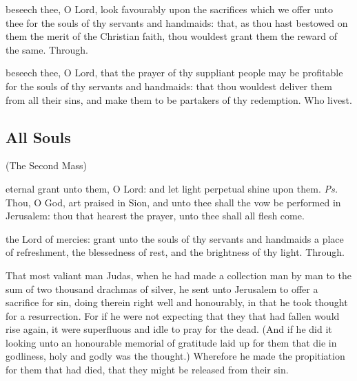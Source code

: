 \secret
{} beseech thee, O Lord, look favourably upon the sacrifices which we offer unto thee for the souls of thy servants and handmaids: that, as thou hast bestowed on them the merit of the Christian faith, thou wouldest grant them the reward of the same. Through.


\postcommunion
{} beseech thee, O Lord, that the prayer of thy suppliant people may be profitable for the souls of thy servants and handmaids: that thou wouldest deliver them from all their sins, and make them to be partakers of thy redemption. Who livest.


\subsection{All Souls}

\centerline{\small{(The Second Mass)}}\label{AllSoulsII}

\vspace{0.25\baselineskip}

\introit
{} eternal grant unto them, O Lord: and let light perpetual shine upon them. \textit{Ps.} Thou, O God, art praised in Sion, and unto thee shall the vow be performed in Jerusalem: thou that hearest the prayer, unto thee shall all flesh come.

\collect
{} the Lord of mercies: grant unto the souls of thy servants and handmaids a place of refreshment, the blessedness of rest, and the brightness of thy light. Through.

 That most valiant man Judas, when he had made a collection man by man to the sum of two thousand drachmas of silver, he sent unto Jerusalem to offer a sacrifice for sin, doing therein right well and honourably, in that he took thought for a resurrection. For if he were not expecting that they that had fallen would rise again, it were superfluous and idle to pray for the dead. (And if he did it looking unto an honourable memorial of gratitude laid up for them that die in godliness, holy and godly was the thought.) Wherefore he made the propitiation for them that had died, that they might be released from their sin. 

